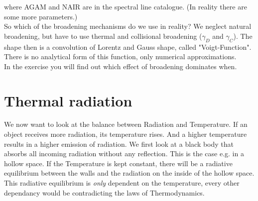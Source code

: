 \documentclass[a4paper,fleqn]{article}
\begin{document}
where AGAM and NAIR are in the spectral line catalogue. (In reality there are some more parameters.) \\

So which of the broadening mechanisms do we use in reality? We neglect natural broadening, but have to use thermal and collisional broadening ($\gamma_{D}$ and $\gamma_{C}$). The shape then is a convolution of Lorentz and Gauss shape, called "Voigt-Function". There is no analytical form of this function, only numerical approximations. \\

In the exercise you will find out which effect of broadening dominates when. 

\section{Thermal radiation}

We now want to look at the balance between Radiation and Temperature. If an object receives more radiation, its temperature rises. And a higher temperature results in a higher emission of radiation. We first look at a black body that absorbs all incoming radiation without any reflection. This is the case e.g. in a hollow space. If the Temperature is kept constant, there will be a radiative equilibrium between the walls and the radiation on the inside of the hollow space. This radiative equilibrium is \textit{only} dependent on the temperature, every other dependancy would be contradicting the laws of Thermodynamics.
\end{document}
